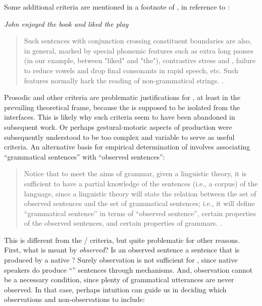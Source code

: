 Some additional  criteria are mentioned in a footnote of \citet{Chomsky1957}, in reference to :

\ea\label{ex:6:4}
\textit{John enjoyed the book and liked the play}
\z

\begin{quote}
Such sentences with conjunction crossing constituent boundaries are also, in general, marked by special phonemic features such as extra long pauses (in our example, between "liked" and "the"), contrastive stress and , failure to reduce vowels and drop final consonants in rapid speech, etc. Such features normally hark the reading of non-grammatical strings. \citep[35-36]{Chomsky1957}.
\end{quote}

Prosodic and other  criteria are problematic justifications for , at least in the prevailing theoretical frame, because the  is supposed to be isolated from the  interfaces. This is likely why such criteria seem to have been abandoned in subsequent work. Or perhaps gestural-motoric aspects of production were subsequently understood to be too complex and variable to serve as useful criteria. An alternative basis for empirical determination of  involves associating “grammatical sentences” with “observed sentences”:

\begin{quote}	
  Notice that to meet the aims of grammar, given a linguistic theory, it is sufficient to have a partial knowledge of the sentences (i.e., a corpus) of the language, since a linguistic theory will state the relation between the set of observed sentences and the set of grammatical sentences; i.e., it will define “grammatical sentence” in terms of “observed sentence”, certain properties of the observed sentences, and certain properties of grammars. \citep[14]{Chomsky1957}.
\end{quote}

  This is different from the / criteria, but quite problematic for other reasons. First, what is meant by \textit{observed}? Is an observed sentence a sentence that is produced by a native ? Surely observation is not sufficient for , since native speakers do produce “” sentences through  mechanisms. And, observation cannot be a necessary condition, since plenty of grammatical utterances are never observed. In that case, perhaps intuition can guide us in deciding which observations and non-observations to include:
  
